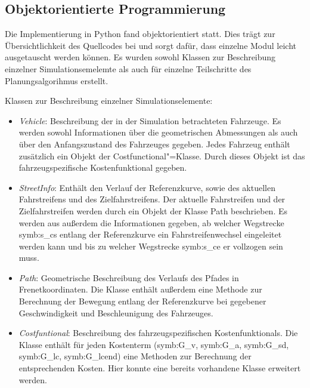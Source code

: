 \subsection{Objektorientierte Programmierung}
\label{sec:Objektorientiert}
Die Implementierung in Python fand objektorientiert statt.
Dies tr\"agt zur \"Ubersichtlichkeit des Quellcodes bei und sorgt daf\"ur, dass einzelne Modul leicht ausgetauscht werden k\"onnen.
Es wurden sowohl Klassen zur Beschreibung einzelner Simulationsemelemte als auch f\"ur einzelne Teilschritte des Planungsalgorihmus erstellt.

Klassen zur Beschreibung einzelner Simulationselemente:
\begin{itemize}
\item \textit{Vehicle}: Beschreibung der in der Simulation betrachteten Fahrzeuge. 
Es werden sowohl Informationen \"uber die geometrischen Abmessungen als auch \"uber den Anfangszustand des Fahrzeuges gegeben. 
Jedes Fahrzeug enth\"alt zus\"atzlich ein Objekt der Costfunctional"=Klasse. 
Durch dieses Objekt ist das fahrzeugspezifische Kostenfunktional gegeben.

\item \textit{StreetInfo}: Enth\"alt den Verlauf der Referenzkurve, sowie des aktuellen Fahrstreifens und des Zielfahrstreifens. 
Der aktuelle Fahrstreifen und der Zielfahrstreifen werden durch ein Objekt der Klasse Path beschrieben.
Es werden aus au{\ss}erdem die Informationen gegeben, ab welcher Wegstrecke \gls{symb:s_cs} entlang der Referenzkurve ein Fahrstreifenwechsel eingeleitet werden kann und bis zu welcher Wegstrecke \gls{symb:s_ce} er vollzogen sein muss.

\item \textit{Path}: Geometrische Beschreibung des Verlaufs des Pfades in Frenetkoordinaten.
Die Klasse enth\"alt au{\ss}erdem eine Methode zur Berechnung der Bewegung entlang der Referenzkurve bei gegebener Geschwindigkeit und Beschleunigung des Fahrzeuges.

\item \textit{Costfuntional}: Beschreibung des fahrzeugspezifischen Kostenfunktionals. 
Die Klasse enth\"alt f\"ur jeden Kostenterm (\gls{symb:G_v}, \gls{symb:G_a}, \gls{symb:G_sd}, \gls{symb:G_lc}, \gls{symb:G_lcend}) eine Methoden zur Berechnung der entsprechenden Kosten.
Hier konnte eine bereits vorhandene Klasse erweitert werden.
\end{itemize}

